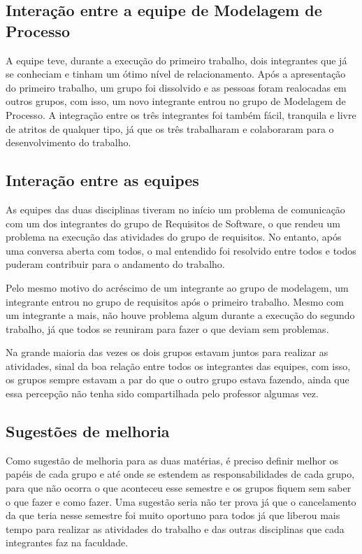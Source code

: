 \subsection{Interação entre a equipe de Modelagem de Processo}
A equipe teve, durante a execução do primeiro trabalho, dois integrantes que já se conheciam e tinham um ótimo nível de relacionamento. Após a apresentação do primeiro trabalho, um grupo foi dissolvido e as pessoas foram realocadas em outros grupos, com isso, um novo integrante entrou no grupo de Modelagem de Processo. A integração entre os três integrantes foi também fácil,  tranquila e livre de atritos de qualquer tipo, já que os três trabalharam e colaboraram para o desenvolvimento do trabalho.

\subsection{Interação entre as equipes}
As equipes das duas disciplinas tiveram no início um problema de comunicação com um dos integrantes do grupo de Requisitos de Software, o que rendeu um problema na execução das atividades do grupo de requisitos. No entanto, após uma conversa aberta com todos, o mal entendido foi resolvido entre todos e todos puderam contribuir para o andamento do trabalho. 

Pelo mesmo motivo do acréscimo de um integrante ao grupo de modelagem, um integrante entrou no grupo de requisitos após o primeiro trabalho. Mesmo com um integrante a mais, não houve problema algum durante a execução do segundo trabalho, já que todos se reuniram para fazer o que deviam sem problemas.

Na grande maioria das vezes os dois grupos estavam juntos para realizar as atividades, sinal da boa relação entre todos os integrantes das equipes, com isso, os grupos sempre estavam a par do que o outro grupo estava fazendo, ainda que essa percepção não tenha sido compartilhada pelo professor algumas vez.

\subsection{Sugestões de melhoria}
Como sugestão de melhoria para as duas matérias, é preciso definir melhor os papéis de cada grupo e até onde se estendem as responsabilidades de cada grupo, para que não ocorra o que aconteceu esse semestre e os grupos fiquem sem saber o que fazer e como fazer. Uma sugestão seria não ter prova já que o cancelamento da que teria nesse semestre foi muito oportuno para todos já que liberou mais tempo para realizar as atividades do trabalho e das outras disciplinas que cada integrantes faz na faculdade. 


